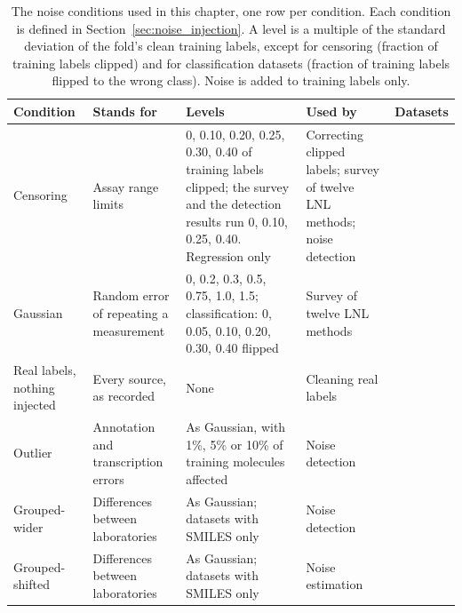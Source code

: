 \begin{table}[htbp]
\centering
\caption{The noise conditions used in this chapter, one row per condition. Each condition is
defined in Section~\ref{sec:noise_injection}. A level is a multiple of the standard deviation of
the fold's clean training labels, except for censoring (fraction of training labels clipped) and
for classification datasets (fraction of training labels flipped to the wrong class). Noise is
added to training labels only.}
\label{tab:noise_conditions_lnl}
\small
\setlength{\tabcolsep}{4pt}
\begin{tabular}{p{2.0cm}p{2.9cm}p{3.8cm}p{2.7cm}p{1.8cm}}
\toprule
\textbf{Condition} & \textbf{Stands for} & \textbf{Levels} & \textbf{Used by} & \textbf{Datasets} \\
\midrule
Censoring & Assay range limits \citep{Svensson2025} & 0, 0.10, 0.20, 0.25, 0.30, 0.40 of training labels clipped; the survey and the detection results run 0, 0.10, 0.25, 0.40. Regression only & Correcting clipped labels; survey of twelve LNL methods; noise detection &
\\
Gaussian & Random error of repeating a measurement & 0, 0.2, 0.3, 0.5, 0.75, 1.0, 1.5; classification: 0, 0.05, 0.10, 0.20, 0.30, 0.40 flipped & Survey of twelve LNL methods &
\\
Real labels, nothing injected & Every source, as recorded & None & Cleaning real labels &
\\
Outlier & Annotation and transcription errors \citep{Kalliokoski2013, Hampel2001} & As Gaussian, with 1\%, 5\% or 10\% of training molecules affected & Noise detection &
\\
Grouped-wider & Differences between laboratories \citep{Bentz2013} & As Gaussian; datasets with SMILES only & Noise detection &
\\
Grouped-shifted & Differences between laboratories \citep{Bentz2013} & As Gaussian; datasets with SMILES only & Noise estimation &
\\
\bottomrule
\end{tabular}
\end{table}

